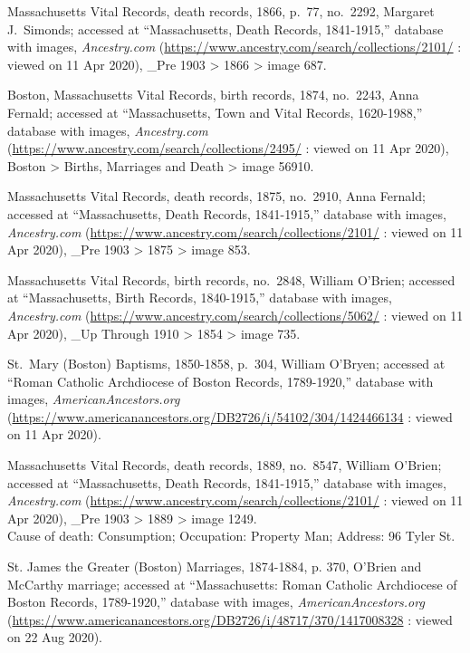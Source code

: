 \begin{thebibliography}{999}
	Massachusetts Vital Records, death records, 1866, p.\ 77, no.\ 2292, Margaret J.\ Simonds; accessed at ``Massachusetts, Death Records, 1841-1915,'' database with images, \textit{Ancestry.com} (\url{https://www.ancestry.com/search/collections/2101/} : viewed on 11 Apr 2020), \_Pre 1903 > 1866 > image 687.
	
	Boston, Massachusetts Vital Records, birth records, 1874, no.\ 2243, Anna Fernald; accessed at ``Massachusetts, Town and Vital Records, 1620-1988,'' database with images, \textit{Ancestry.com} (\url{https://www.ancestry.com/search/collections/2495/} : viewed on 11 Apr 2020), Boston > Births, Marriages and Death > image 56910.
	
	Massachusetts Vital Records, death records, 1875, no.\ 2910, Anna Fernald; accessed at ``Massachusetts, Death Records, 1841-1915,'' database with images, \textit{Ancestry.com} (\url{https://www.ancestry.com/search/collections/2101/} : viewed on 11 Apr 2020), \_Pre 1903 > 1875 > image 853.
	
	Massachusetts Vital Records, birth records, no.\ 2848, William O'Brien; accessed at ``Massachusetts, Birth Records, 1840-1915,'' database with images, \textit{Ancestry.com} (\url{https://www.ancestry.com/search/collections/5062/} : viewed on 11 Apr 2020), \_Up Through 1910 > 1854 > image 735.
	
	St.\ Mary (Boston) Baptisms, 1850-1858, p.\ 304, William O'Bryen; accessed at ``Roman Catholic Archdiocese of Boston Records, 1789-1920,'' database with images, \textit{AmericanAncestors.org} (\url{https://www.americanancestors.org/DB2726/i/54102/304/1424466134} : viewed on 11 Apr 2020).	
	
	Massachusetts Vital Records, death records, 1889, no.\ 8547, William O'Brien; accessed at ``Massachusetts, Death Records, 1841-1915,'' database with images, \textit{Ancestry.com} (\url{https://www.ancestry.com/search/collections/2101/} : viewed on 11 Apr 2020), \_Pre 1903 > 1889 > image 1249.\\
	Cause of death: Consumption; Occupation: Property Man; Address: 96 Tyler St.
	
	St. James the Greater (Boston) Marriages, 1874-1884, p. 370, O'Brien and McCarthy marriage; accessed at ``Massachusetts: Roman Catholic Archdiocese of Boston Records, 1789-1920,'' database with images, \textit{AmericanAncestors.org} (\url{https://www.americanancestors.org/DB2726/i/48717/370/1417008328} : viewed on 22 Aug 2020).
	

\end{thebibliography}
